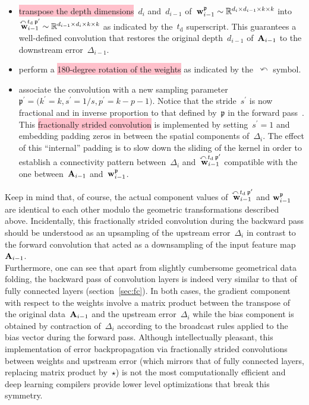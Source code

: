 \documentclass{article}
\begin{document}
\begin{itemize}
\item \colorbox{pink}{transpose the depth dimensions}~$d_i$ and~$d_{i-1}$ of~${\bf w}^\mathfrak{p}_{i-1} \sim \mathbb{R}^{d_i \times d_{i-1} \times k \times k}$ into~$\overset{\curvearrowleft \, t_{\text{d}} \, \mathfrak{p^\prime} }{{\bf w}_{i-1}} \sim \mathbb{R}^{d_{i-1} \times d_i  \times k \times k}$ as indicated by the~$t_\text{d}$ superscript.  This guarantees a well-defined convolution that restores the original depth~$d_{i-1}$ of~${\bf A}_{i-1}$ to the downstream error~$\Delta_{i-1}$. 
\item perform a \colorbox{pink}{180-degree rotation of the weights} as indicated by the~$\curvearrowleft$ symbol.
\item associate the convolution with a new sampling parameter~$\mathfrak{p^\prime} = \big( k^\prime = k , s^\prime = 1/s , p^\prime = k-p-1 \big) $.  Notice that the stride~$s^\prime$ is now fractional and in inverse proportion to that defined by~$\mathfrak{p}$ in the forward pass~\cite{fracStride}.  This \colorbox{pink}{fractionally strided convolution} is implemented by setting~$s^\prime=1$ and embedding padding zeros in between the spatial components of~$\Delta_i$.  The effect of this ``internal'' padding is to slow down the sliding of the kernel in order to establish a connectivity pattern between~$\Delta_i$ and~$\overset{\curvearrowleft \, t_{\text{d}} \, \mathfrak{p^\prime} }{{\bf w}_{i-1}}$ compatible with the one between~${\bf A}_{i-1}$ and~${\bf w}^\mathfrak{p}_{i-1}$.
\end{itemize}
Keep in mind that, of course, the actual component values of~$\overset{\curvearrowleft \, t_{\text{d}} \, \mathfrak{p^\prime} }{{\bf w}_{i-1}}$ and ${\bf w}^\mathfrak{p}_{i-1}$ are identical to each other modulo the geometric transformations described above.  Incidentally, this fractionally strided convolution during the backward pass should be understood as an upsampling of the upstream error~${\Delta_i}$ in contrast to the forward convolution that acted as a downsampling of the input feature map~${\bf A}_{i-1}$. \\

\noindent Furthermore, one can see that apart from slightly cumbersome geometrical data folding, the backward pass of convolution layers is indeed very similar to that of fully connected layers (section~\ref{sec:fc}).  In both cases, the gradient component with respect to the weights involve a matrix product between the transpose of the original data~${\bf A}_{i-1}$ and the upstream error~$\Delta_i$ while the bias component is obtained by contraction of~$\Delta_i$ according to the broadcast rules applied to the bias vector during the forward pass.  Although intellectually pleasant, this implementation of error backpropagation via fractionally strided convolutions between weights and upstream error (which mirrors that of fully connected layers, replacing matrix product by~$\star$) is not the most computationally efficient and deep learning compilers provide lower level optimizations that break this symmetry.
\end{document}

